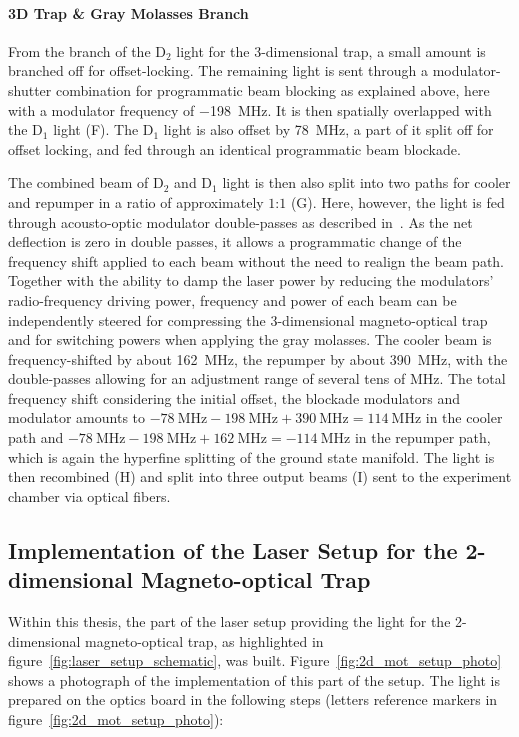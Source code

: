 \paragraph{3D Trap \& Gray Molasses Branch} From the branch of the D$_2$ light for the 3-dimensional trap, a small amount is branched off for offset-locking. The remaining light is sent through a modulator-shutter combination for programmatic beam blocking as explained above, here with a modulator frequency of \SI{-198}{\mega\hertz}. It is then spatially overlapped with the D$_1$ light (F). The D$_1$ light is also offset by \SI{+78}{\mega\hertz}, a part of it split off for offset locking, and fed through an identical programmatic beam blockade.

The combined beam of D$_2$ and D$_1$ light is then also split into two paths for cooler and repumper in a ratio of approximately $1$:$1$ (G). Here, however, the light is fed through acousto-optic modulator double-passes as described in~\cite{qesja_design_2022}. As the net deflection is zero in double passes, it allows a programmatic change of the frequency shift applied to each beam without the need to realign the beam path. Together with the ability to damp the laser power by reducing the modulators' radio-frequency driving power, frequency and power of each beam can be independently steered for compressing the 3-dimensional magneto-optical trap and for switching powers when applying the gray molasses. The cooler beam is frequency-shifted by about \SI{+162}{\mega\hertz}, the repumper by about \SI{+390}{\mega\hertz}, with the double-passes allowing for an adjustment range of several tens of \si{\mega\hertz}. The total frequency shift considering the initial offset, the blockade modulators and modulator amounts to $\SI{-78}{\mega\hertz} - \SI{198}{\mega\hertz} + \SI{390}{\mega\hertz} = \SI{+114}{\mega\hertz}$ in the cooler path and $\SI{-78}{\mega\hertz} - \SI{198}{\mega\hertz} + \SI{162}{\mega\hertz} = \SI{-114}{\mega\hertz}$ in the repumper path, which is again the hyperfine splitting of the ground state manifold. The light is then recombined (H) and split into three output beams (I) sent to the experiment chamber via optical fibers.

\subsection*{Implementation of the Laser Setup for the 2-dimensional Magneto-optical Trap}
Within this thesis, the part of the laser setup providing the light for the 2-dimensional magneto-optical trap, as highlighted in figure~\ref{fig:laser_setup_schematic}, was built.
Figure~\ref{fig:2d_mot_setup_photo} shows a photograph of the implementation of this part of the setup. The light is prepared on the optics board in the following steps (letters reference markers in figure~\ref{fig:2d_mot_setup_photo}):

